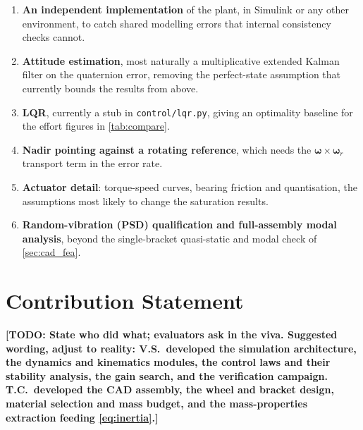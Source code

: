 \documentclass[conference,10pt,a4paper]{IEEEtran}
\newcommand{\TODO}[1]{\textbf{[TODO: #1]}}
\newcommand{\TODO}[1]{}
\newcommand{\vect}[1]{\bm{#1}}
\begin{document}
\begin{enumerate}
\item \textbf{An independent implementation} of the plant, in Simulink or any
other environment, to catch shared modelling errors that internal consistency
checks cannot.
\item \textbf{Attitude estimation}, most naturally a multiplicative extended
Kalman filter on the quaternion error, removing the perfect-state assumption
that currently bounds the results from above.
\item \textbf{LQR}, currently a stub in \texttt{control/lqr.py}, giving an
optimality baseline for the effort figures in \cref{tab:compare}.
\item \textbf{Nadir pointing against a rotating reference}, which needs the
$\vect{\omega}\times\vect{\omega}_r$ transport term in the error rate.
\item \textbf{Actuator detail}: torque-speed curves, bearing friction and
quantisation, the assumptions most likely to change the saturation results.
\item \textbf{Random-vibration (PSD) qualification and full-assembly modal
analysis}, beyond the single-bracket quasi-static and modal check of
\cref{sec:cad_fea}.
\end{enumerate}

\section*{Contribution Statement}

\TODO{State who did what; evaluators ask in the viva. Suggested wording, adjust
to reality: V.S.\ developed the simulation architecture, the dynamics and
kinematics modules, the control laws and their stability analysis, the gain
search, and the verification campaign. T.C.\ developed the CAD assembly, the
wheel and bracket design, material selection and mass budget, and the
mass-properties extraction feeding \cref{eq:inertia}.}
\end{document}
